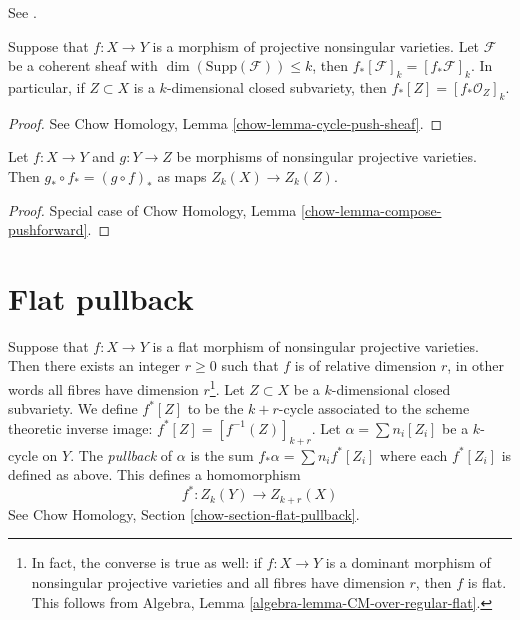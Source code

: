 \begin{lemma}
\label{lemma-push-coherent}
\begin{reference}
See \cite[Chapter V]{Serre_algebre_locale}.
\end{reference}
Suppose that $f : X \to Y$ is a morphism of projective nonsingular varieties.
Let $\mathcal{F}$ be a coherent sheaf with
$\dim(\text{Supp}(\mathcal{F})) \leq k$, then
$f_*[\mathcal{F}]_k = [f_*\mathcal{F}]_k$. In particular, if
$Z \subset X$ is a $k$-dimensional closed subvariety, then
$f_*[Z] = [f_*\mathcal{O}_Z]_k$.
\end{lemma}

\begin{proof}
See Chow Homology, Lemma \ref{chow-lemma-cycle-push-sheaf}.
\end{proof}

\begin{lemma}
\label{lemma-compose-pushforward}
Let $f : X \to Y$ and $g : Y \to Z$ be morphisms of nonsingular projective
varieties. Then $g_* \circ f_* = (g \circ f)_*$ as maps $Z_k(X) \to Z_k(Z)$.
\end{lemma}

\begin{proof}
Special case of Chow Homology, Lemma \ref{chow-lemma-compose-pushforward}.
\end{proof}



\section{Flat pullback}
\label{section-flat-pullback}

\noindent
Suppose that $f : X \to Y$ is a flat morphism of nonsingular projective
varieties. Then there exists an integer $r \geq 0$ such that $f$ is of
relative dimension $r$, in other words all fibres have dimension
$r$\footnote{In fact, the converse is true as well: if $f : X \to Y$ is
a dominant morphism of nonsingular projective varieties and all fibres have
dimension $r$, then $f$ is flat. This follows from
Algebra, Lemma \ref{algebra-lemma-CM-over-regular-flat}.}.
Let $Z \subset X$ be a $k$-dimensional closed subvariety. We define
$f^*[Z]$ to be the $k + r$-cycle associated to the scheme theoretic
inverse image: $f^*[Z] = [f^{-1}(Z)]_{k + r}$. Let
$\alpha = \sum n_i [Z_i]$ be a $k$-cycle on $Y$. The {\it pullback} of
$\alpha$ is the sum $f_* \alpha = \sum n_i f^*[Z_i]$ where each $f^*[Z_i]$
is defined as above. This defines a homomorphism
$$
f^* : Z_k(Y) \longrightarrow Z_{k + r}(X)
$$
See Chow Homology, Section \ref{chow-section-flat-pullback}.

